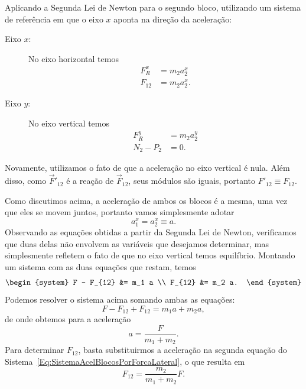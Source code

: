 Aplicando a Segunda Lei de Newton para o segundo bloco, utilizando um sistema de referência em que o eixo $x$ aponta na direção da aceleração:
\begin{description}
    \item[Eixo $x$:] No eixo horizontal temos
        \begin{align}
            F_R^x &= m_2 a_2^x \\
            F_{12} &= m_2 a_2^x.
        \end{align}
    \item[Eixo $y$:] No eixo vertical temos
        \begin{align}
            F_R^y &= m_2 a_2^y \\
            N_2 - P_2 &= 0.
        \end{align}
\end{description}
%
Novamente, utilizamos o fato de que a aceleração no eixo vertical é nula. Além disso, como $\vec{F}'_{12}$ é a reação de $\vec{F}_{12}$, seus módulos são iguais, portanto $F'_{12} \equiv F_{12}$.

Como discutimos acima, a aceleração de ambos os blocos é a mesma, uma vez que eles se movem juntos, portanto vamos simplesmente adotar
\begin{equation}
    a_1^x = a_2^x \equiv a.
\end{equation}
%
Observando as equações obtidas a partir da Segunda Lei de Newton, verificamos que duas delas não envolvem as variáveis que desejamos determinar, mas simplesmente refletem o fato de que no eixo vertical temos equilíbrio. Montando um sistema com as duas equações que restam, temos
\begin{equation}\label{Eq:SistemaAcelBlocosPorForcaLateral}
\begin{system}
    F - F_{12} &= m_1 a \\
    F_{12} &= m_2 a.
\end{system}
\end{equation}
%
Podemos resolver o sistema acima somando ambas as equações:
\begin{equation}
    F - F_{12} + F_{12} = m_1 a + m_2 a,
\end{equation}
%
de onde obtemos para a aceleração
\begin{equation}
    a = \frac{F}{m_1 + m_2}.
\end{equation}
%
Para determinar $F_{12}$, basta substituirmos a aceleração na segunda equação do Sistema~\eqref{Eq:SistemaAcelBlocosPorForcaLateral}, o que resulta em
\begin{equation}
    F_{12} = \frac{m_2}{m_1 + m_2} F.
\end{equation}

